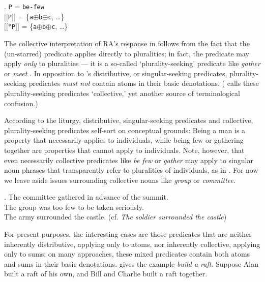 \documentclass[linguex]{sp}
\newcommand{\sem}[1]{\mbox{$[\![$#1$]\!]$}}
\renewcommand{\tt}{\texttt}
\newcommand{\op}{$\oplus$}
\begin{document}
\ex. \tt{P} = \tt{be-few}\\
\sem{\tt{P}} = \{\tt{a}\op\tt{b}\op\tt{c}, \ldots\}\\
\sem{*\tt{P}} = \{\tt{a}\op\tt{b}\op\tt{c}, \ldots\}

The collective interpretation of RA's response in \LLast follows from the fact that the (un-starred) predicate applies directly to pluralities; in fact, the predicate may apply \emph{only} to pluralities --- it is a so-called `plurality-seeking' predicate like \emph{gather} or \emph{meet} \citep{schwarzschild1994}. In opposition to \citeauthor{link1983}'s distributive, or singular-seeking predicates, plurality-seeking predicates \emph{must not} contain atoms in their basic denotations. (\citeauthor{link1983} calls these plurality-seeking predicates `collective,' yet another source of terminological confusion.)

According to the liturgy, distributive, singular-seeking predicates and collective, plurality-seeking predicates self-sort on conceptual grounds: Being a man is a property that necessarily applies to individuals, while being few or gathering together are properties that cannot apply to individuals. Note, however, that even necessarily collective predicates like \emph{be few} or \emph{gather} may apply to singular noun phrases that transparently refer to pluralities of individuals, as in \Next. For now we leave aside issues surrounding collective nouns like \emph{group} or \emph{committee}. %

\ex. The committee gathered in advance of the summit.\\
The group was too few to be taken seriously.\\
The army surrounded the castle. (cf. \emph{The soldier surrounded the castle})


For present purposes, the interesting cases are those predicates that are neither inherently distributive, applying only to atoms, nor inherently collective, applying only to sums; on many approaches, these mixed predicates contain both atoms and sums in their basic denotations. \citeauthor{link1983} gives the example \emph{build a raft}. Suppose Alan built a raft of his own, and Bill and Charlie built a raft together.
\end{document}
